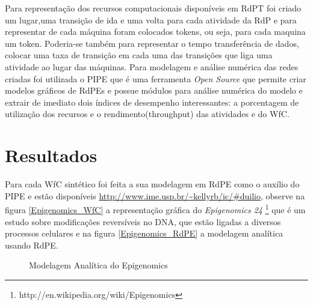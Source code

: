 \documentclass[a4paper,10pt]{article}
\begin{document}
	Para representação dos recursos computacionais disponíveis em RdPT foi criado um lugar,uma transição de ida e uma volta para cada atividade da RdP e para representar de cada máquina foram colocados tokens, ou seja, para cada maquina um token. Poderia-se também para representar o tempo transferência de dados, colocar uma taxa de transição em cada uma das transições que liga uma atividade ao lugar das máquinas. Para modelagem e análise numérica das redes criadas foi utilizada o PIPE que é uma ferramenta \textit{Open Source} que permite criar modelos gráficos de RdPEs e possue módulos para análise numérica do modelo e extrair de imediato dois índices de desempenho interessantes: a porcentagem de utilização dos recursos e o rendimento(throughput) das atividades e do WfC.
	
\section*{Resultados}
	Para cada WfC sintético foi feita a sua modelagem em RdPE como o auxílio do PIPE e estão disponíveis \url{http://www.ime.usp.br/~kellyrb/ic/#duilio}, observe na figura \ref{Epigenomics_WfC} a representação gráfica do \textit{Epigenomics 24} \footnote{http://en.wikipedia.org/wiki/Epigenomics} que é um estudo sobre modificações reversíveis no DNA, que estão ligadas a diversos processos celulares e na figura \ref{Epigenomics_RdPE} a modelagem analítica usando RdPE.

\begin{figure}[!h]
	\centering
	\quad %
	\caption{Modelagem Analítica do Epigenomics}
	\label{modelagem_analitica}
\end{figure}
\newpage
\end{document}

